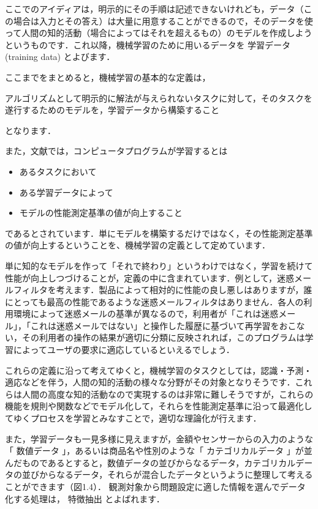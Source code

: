 ここでのアイディアは，明示的にその手順は記述できないけれども，データ（この場合は入力とその答え）は大量に用意することができるので，そのデータを使って人間の知的活動（場合によってはそれを超えるもの）のモデルを作成しようというものです．これ以降，機械学習のために用いるデータを
学習データ (training data)
とよびます．

ここまでをまとめると，機械学習の基本的な定義は，

アルゴリズムとして明示的に解法が与えられないタスクに対して，そのタスクを遂行するためのモデルを，学習データから構築すること

となります．


また，文献\cite{mitchell97}では，コンピュータプログラムが学習するとは
\begin{itemize}
\item あるタスクにおいて
\item ある学習データによって
\item モデルの性能測定基準の値が向上すること
\end{itemize}
であるとされています．単にモデルを構築するだけではなく，その性能測定基準の値が向上するということを、機械学習の定義として定めています．

単に知的なモデルを作って「それで終わり」というわけではなく，学習を続けて性能が向上しつづけることが，定義の中に含まれています．例として，迷惑メールフィルタを考えます．製品によって相対的に性能の良し悪しはありますが，誰にとっても最高の性能であるような迷惑メールフィルタはありません．各人の利用環境によって迷惑メールの基準が異なるので，利用者が「これは迷惑メール」，「これは迷惑メールではない」と操作した履歴に基づいて再学習をおこない，その利用者の操作の結果が適切に分類に反映されれば，このプログラムは学習によってユーザの要求に適応しているといえるでしょう．

これらの定義に沿って考えてゆくと，機械学習のタスクとしては，認識・予測・適応などを伴う，人間の知的活動の様々な分野がその対象となりそうです．これらは人間の高度な知的活動なので実現するのは非常に難しそうですが，これらの機能を規則や関数などでモデル化して，それらを性能測定基準に沿って最適化してゆくプロセスを学習とみなすことで，適切な理論化が行えます．


また，学習データも一見多様に見えますが，金額やセンサーからの入力のような「
数値データ
」，あるいは商品名や性別のような「
カテゴリカルデータ
」が並んだものであるとすると，数値データの並びからなるデータ，カテゴリカルデータの並びからなるデータ，それらが混合したデータというように整理して考えることができます（図1.4）．
観測対象から問題設定に適した情報を選んでデータ化する処理は，
特徴抽出
とよばれます．


